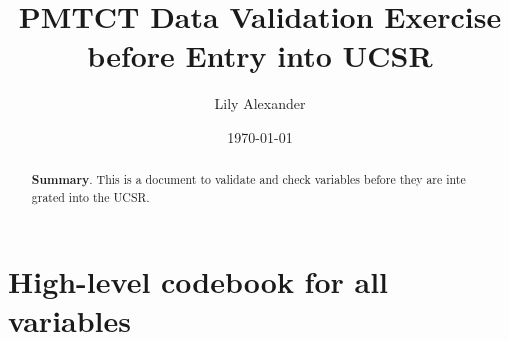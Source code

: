 \documentclass{article}
\begin{document}
\title{PMTCT Data Validation Exercise before Entry into UCSR}\author{
Lily Alexander
}

\date{
\bigskip
\today
}

\maketitle

\begin{abstract}
\textbf{Summary}. This is a document to validate and check variables before they are inte
grated into the UCSR.
\end{abstract}

\section{High-level codebook for all variables}
\end{document}
